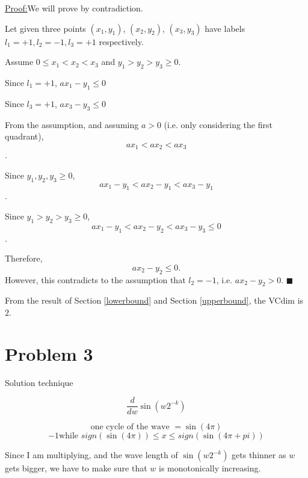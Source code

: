 \documentclass[11pt]{article}
\newenvironment{claimproof}[1]{\par\noindent\underline{Proof:}\space#1}{\hfill $\blacksquare$}
\begin{document}
\begin{claimproof}
We will prove by contradiction.

Let given three points $(x_1, y_1)$, $(x_2, y_2)$, $(x_3, y_3)$ have labels ${l_1 = +1, l_2 = -1, l_3 = +1}$ respectively.

Assume $0 \leq x_1 < x_2 < x_3$ and $y_1 > y_2 > y_3 \geq 0$.

Since $l_1 = +1$, $ax_1 - y_1 \leq 0$

Since $l_3 = +1$, $ax_3 - y_3 \leq 0$

From the assumption, and assuming $a > 0$ (i.e. only considering the first quadrant), $$ax_1 < ax_2 < ax_3$$. 

Since $y_1, y_2, y_3 \geq 0$, $$ax_1 - y_1 < ax_2 - y_1 < ax_3 - y_1$$.

Since $y_1 > y_2 > y_3 \geq 0$, $$ax_1 - y_1 < ax_2 - y_2 < ax_3 - y_3 \leq 0$$.

Therefore,$$ax_2 - y_2 \leq 0.$$
However, this contradicts to the assumption that $l_2 = -1$, i.e. $ax_2 - y_2 > 0$.
\end{claimproof}

From the result of Section \ref{lowerbound} and Section \ref{upperbound}, the VCdim is $2$.


\section{Problem 3}
Solution technique

$$
\frac{d}{dw} \sin(w2^{-k})
$$

$$
\mbox{one cycle of the wave }= \sin(4\pi)
$$
$$
-1 \mbox{while } sign(\sin(4\pi)) \leq x \leq sign(\sin(4\pi + pi))
$$

Since I am multiplying, and the wave length of $\sin(w2^{-k})$ gets thinner as $w$ gets bigger, we have to make sure that $w$ is monotonically increasing.
\end{document}
